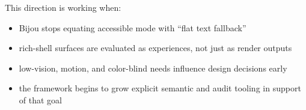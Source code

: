 This direction is working when:

\begin{itemize}
\tightlist
\item
  Bijou stops equating accessible mode with ``flat text fallback''
\item
  rich-shell surfaces are evaluated as experiences, not just as render outputs
\item
  low-vision, motion, and color-blind needs influence design decisions early
\item
  the framework begins to grow explicit semantic and audit tooling in support of that goal
\end{itemize}

